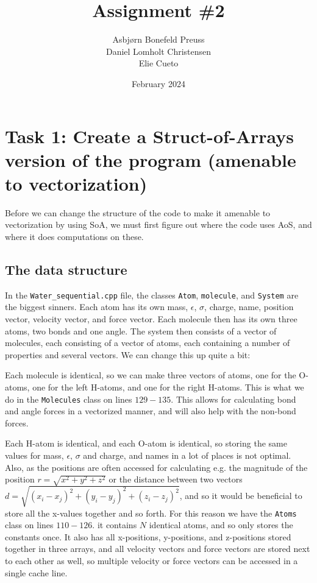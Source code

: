 \documentclass{article}
\title{Assignment \#2}
\author{Asbjørn Bonefeld Preuss\\ Daniel Lomholt Christensen \\ Elie Cueto}
\date{February 2024}
\begin{document}
\maketitle
\section{Task 1: Create a Struct-of-Arrays version of the program (amenable to
vectorization)}
Before we can change the structure of the code to make it amenable to vectorization by using SoA, we must first figure out where the code uses AoS, and where it does computations on these.

\subsection{The data structure}
In the \texttt{Water\_sequential.cpp} file, the classes \texttt{Atom}, \texttt{molecule}, and \texttt{System} are the biggest sinners. Each atom has its own mass, $\epsilon$, $\sigma$, charge, name, position vector, velocity vector, and force vector. Each molecule then has its own three atoms, two bonds and one angle. The system then consists of a vector of molecules, each consisting of a vector of atoms, each containing a number of properties and several vectors. We can change this up quite a bit: 

Each molecule is identical, so we can make three vectors of atoms, one for the O-atoms, one for the left H-atoms, and one for the right H-atoms. This is what we do in the \texttt{Molecules} class on lines $129-135$. This allows for calculating bond and angle forces in a vectorized manner, and will also help with the non-bond forces.

Each H-atom is identical, and each O-atom is identical, so storing the same values for mass, $\epsilon$, $\sigma$ and charge, and names in a lot of places is not optimal. Also, as the positions are often accessed for calculating e.g. the magnitude of the position $r=\sqrt{x^2+y^2+z^2}$ or the distance between two vectors $d = \sqrt{(x_i-x_j)^2+(y_i-y_j)^2+(z_i-z_j)^2}$, and so it would be beneficial to store all the x-values together and so forth. For this reason we have the \texttt{Atoms} class on lines $110-126$. it contains $N$ identical atoms, and so only stores the constants once. It also has all x-positions, y-positions, and z-positions stored together in three arrays, and all velocity vectors and force vectors are stored next to each other as well, so multiple velocity or force vectors can be accessed in a single cache line.
\end{document}
